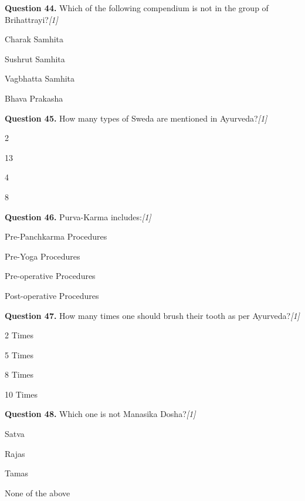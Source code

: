 \documentclass[11pt,a4paper]{article}
\newcommand{\pts}[1]{\hfill   \textit{[#1]}}
\begin{document}
\medskip


\noindent   \textbf{Question 44.} Which of the following compendium is not in the group of Brihattrayi?\pts{1}

\begin{parts}
  \item Charak Samhita
  \item Sushrut Samhita
  \item Vagbhatta Samhita
  \item Bhava Prakasha
\end{parts}

\medskip


\noindent   \textbf{Question 45.} How many types of Sweda are mentioned in Ayurveda?\pts{1}

\begin{parts}
  \item 2
  \item 13
  \item 4
  \item 8
\end{parts}

\medskip


\noindent   \textbf{Question 46.} Purva-Karma includes:\pts{1}

\begin{parts}
  \item Pre-Panchkarma Procedures
  \item Pre-Yoga Procedures
  \item Pre-operative Procedures
  \item Post-operative Procedures
\end{parts}

\medskip


\noindent   \textbf{Question 47.} How many times one should brush their tooth as per Ayurveda?\pts{1}

\begin{parts}
  \item 2 Times
  \item 5 Times
  \item 8 Times
  \item 10 Times
\end{parts}

\medskip


\noindent   \textbf{Question 48.} Which one is not Manasika Dosha?\pts{1}

\begin{parts}
  \item Satva
  \item Rajas
  \item Tamas
  \item None of the above
\end{parts}
\end{document}
